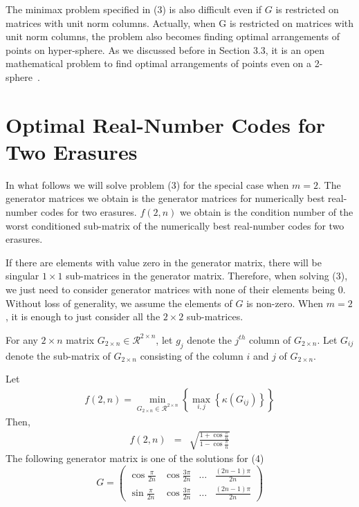 \documentclass{sig-alternate}
\begin{document}
The minimax problem specified in (3) is also difficult even if $G$ is restricted 
on matrices with unit norm columns. Actually, when G is restricted 
on matrices with unit norm columns, the problem also becomes finding optimal arrangements of
points on hyper-sphere. As we discussed before in Section 3.3, 
it is an open mathematical problem to
find optimal arrangements of points even on a 2-sphere~\cite{smale:unsolved}.



\section{ Optimal Real-Number Codes for Two Erasures}
In what follows we will solve problem (3)  for the special case when $m=2$.
The generator matrices we obtain is the generator matrices for 
numerically best real-number codes for two erasures.
$f(2,n)$ we obtain is the condition number of the worst conditioned sub-matrix
of the numerically best real-number codes for two erasures.

If there are elements with value zero in the generator matrix, there will be 
singular $1 \times 1$ sub-matrices in the generator matrix.
Therefore, when solving (3), we just need to consider generator matrices
with none of their elements being $0$. Without loss of generality, we assume the
elements of $G$ is non-zero.  When $m=2$, it is enough to just consider
all the $2 \times 2$ sub-matrices.

For any $2 \times n$ matrix $ G_{2 \times n} \in \mathcal{R}^{2 \times n} $, 
let $g_j$ denote the $j^{th}$ column of $G_{2 \times n}$.
Let $G_{ij}$ denote the sub-matrix of $G_{2 \times n}$ consisting
of the column $i$ and $j$ of $G_{2 \times n}$. 
\begin{theorem}
Let 
\begin{eqnarray}
f(2,n)=\displaystyle \min_{ G_{2 \times n} \in \mathcal{R}^{2 \times n} } 
\left\{ \displaystyle \max_{i,j} \left\{  \kappa (G_{ij}) \right\}  \right\}
\end{eqnarray}
Then, 
\begin{eqnarray}
f(2,n)
&=& \sqrt {\frac{1 + \cos \frac{\pi}  {n} }
{1- \cos \frac{\pi}  {n} } }
\end{eqnarray}
The following generator matrix is one of the solutions for (4)
\[ G= \left( \begin{array}{cccc}
\cos\frac{\pi}{2n}&\cos\frac{3\pi}{2n}&\ldots&\frac{(2n-1)\pi}{2n}  \\
\sin\frac{\pi}{2n}&\cos\frac{3\pi}{2n}&\ldots&\frac{(2n-1)\pi}{2n}      \end{array} \right)\]
\end{theorem}
\end{document}
